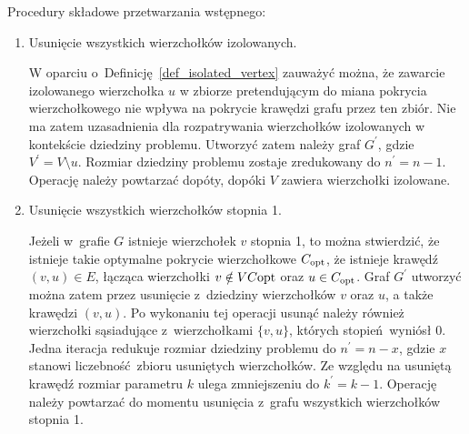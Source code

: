 Procedury składowe przetwarzania wstępnego:
\begin{enumerate}
  \item Usunięcie wszystkich wierzchołków izolowanych.

    W oparciu o~Definicję~\ref{def_isolated_vertex} zauważyć można, że zawarcie
    izolowanego wierzchołka $u$ w zbiorze pretendującym do miana pokrycia
    wierzchołkowego nie wpływa na pokrycie krawędzi grafu przez ten zbiór.
    Nie ma zatem uzasadnienia dla rozpatrywania wierzchołków izolowanych w
    kontekście dziedziny problemu.
    Utworzyć zatem należy graf $G^\prime$, gdzie $V^\prime = V \setminus u$.
    Rozmiar dziedziny problemu zostaje zredukowany do $n^\prime=n-1$.
    Operację należy powtarzać dopóty, dopóki $V$ zawiera wierzchołki izolowane.

  \item Usunięcie wszystkich wierzchołków stopnia 1.

    Jeżeli w~grafie $G$ istnieje wierzchołek $v$ stopnia 1, to można 
    stwierdzić, że istnieje takie optymalne pokrycie wierzchołkowe $C_{\textnormal{opt}}$, że istnieje krawędź $(v,u) \in E$, łącząca wierzchołki $v \notin VC{\textnormal{opt}}$ oraz $u \in C_{\textnormal{opt}}$.
    Graf $G^\prime$ utworzyć można zatem przez usunięcie z~dziedziny wierzchołków $v$ oraz
    $u$, a także krawędzi $(v,u)$.
    Po wykonaniu tej operacji usunąć należy również wierzchołki sąsiadujące z~wierzchołkami
    $\{v,u\}$, których stopień~wyniósł 0.
    Jedna iteracja redukuje rozmiar dziedziny problemu do $n^\prime=n-x$, gdzie
    $x$ stanowi liczebność~zbioru usuniętych wierzchołków.
    Ze względu na usuniętą krawędź rozmiar parametru $k$ ulega zmniejszeniu do
    $k^\prime=k-1$.
    Operację należy powtarzać do momentu usunięcia z~grafu wszystkich
    wierzchołków stopnia 1.


\end{enumerate}
